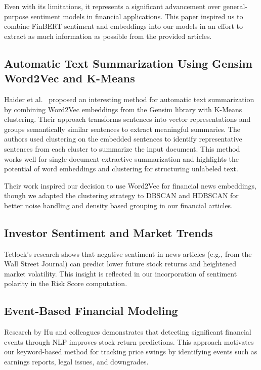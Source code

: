 \documentclass[twocolumn]{article}
\begin{document}
Even with its limitations, it represents a significant advancement over general-purpose sentiment models in financial applications. This paper inspired us to combine FinBERT sentiment and embeddings into our models in an effort to extract as much information as possible from the provided articles.

\subsection{Automatic Text Summarization Using Gensim Word2Vec and K-Means}
Haider et al.~\cite{9230670} proposed an interesting method for automatic text summarization by combining Word2Vec embeddings from the Gensim library with K-Means clustering. Their approach transforms sentences into vector representations and groups semantically similar sentences to extract meaningful summaries. 
The authors used clustering on the embedded sentences to identify representative sentences from each cluster to summarize the input document. This method works well for single-document extractive summarization and highlights the potential of word embeddings and clustering for structuring unlabeled text. 

Their work inspired our decision to use Word2Vec for financial news embeddings, though we adapted the clustering strategy to DBSCAN and HDBSCAN for better noise handling and density based grouping in our financial articles.




\subsection{Investor Sentiment and Market Trends}
Tetlock’s research shows that negative sentiment in news articles (e.g., from the Wall Street Journal) can predict lower future stock returns and heightened market volatility. This insight is reflected in our incorporation of sentiment polarity in the Risk Score computation.

\subsection{Event-Based Financial Modeling}
Research by Hu and colleagues demonstrates that detecting significant financial events through NLP improves stock return predictions. This approach motivates our keyword-based method for tracking price swings by identifying events such as earnings reports, legal issues, and downgrades.
\end{document}
